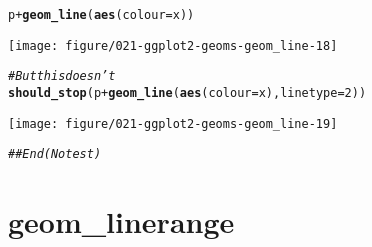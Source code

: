 \documentclass[a4paper,titlepage]{tufte-handout}\usepackage[]{graphicx}\usepackage[]{color}
\makeatletter
\def\maxwidth{ %
  \ifdim\Gin@nat@width>\linewidth
    \linewidth
  \else
    \Gin@nat@width
  \fi
}
\newcommand{\hlnum}[1]{\textcolor[rgb]{0.686,0.059,0.569}{#1}}%
\newcommand{\hlcom}[1]{\textcolor[rgb]{0.678,0.584,0.686}{\textit{#1}}}%
\newcommand{\hlopt}[1]{\textcolor[rgb]{0,0,0}{#1}}%
\newcommand{\hlstd}[1]{\textcolor[rgb]{0.345,0.345,0.345}{#1}}%
\newcommand{\hlkwc}[1]{\textcolor[rgb]{0.333,0.667,0.333}{#1}}%
\newcommand{\hlkwd}[1]{\textcolor[rgb]{0.737,0.353,0.396}{\textbf{#1}}}%
\newenvironment{kframe}{%
 \def\at@end@of@kframe{}%
 \ifinner\ifhmode%
  \def\at@end@of@kframe{\end{minipage}}%
  \begin{minipage}{\columnwidth}%
 \fi\fi%
 \def\FrameCommand##1{\hskip\@totalleftmargin \hskip-\fboxsep
 \colorbox{shadecolor}{##1}\hskip-\fboxsep
     \hskip-\linewidth \hskip-\@totalleftmargin \hskip\columnwidth}%
 \MakeFramed {\advance\hsize-\width
   \@totalleftmargin\z@ \linewidth\hsize
   \@setminipage}}%
 {\par\unskip\endMakeFramed%
 \at@end@of@kframe}
\newenvironment{knitrout}{}{} %
\makeatother
\begin{document}
\begin{knitrout}
\begin{kframe}\begin{alltt}
\hlstd{p} \hlopt{+} \hlkwd{geom_line}\hlstd{(}\hlkwd{aes}\hlstd{(}\hlkwc{colour} \hlstd{= x))}
\end{alltt}
\end{kframe}
\texttt{[image: figure/021-ggplot2-geoms-geom\_line-18]} 
\begin{kframe}\begin{alltt}
\hlcom{# But this doesn't}
\hlkwd{should_stop}\hlstd{(p} \hlopt{+} \hlkwd{geom_line}\hlstd{(}\hlkwd{aes}\hlstd{(}\hlkwc{colour} \hlstd{= x),} \hlkwc{linetype}\hlstd{=}\hlnum{2}\hlstd{))}
\end{alltt}
\end{kframe}
\texttt{[image: figure/021-ggplot2-geoms-geom\_line-19]} 
\begin{kframe}\begin{alltt}
\hlcom{## End(No test)}
\end{alltt}
\end{kframe}
\end{knitrout}


\section{geom\_linerange}
\end{document}
